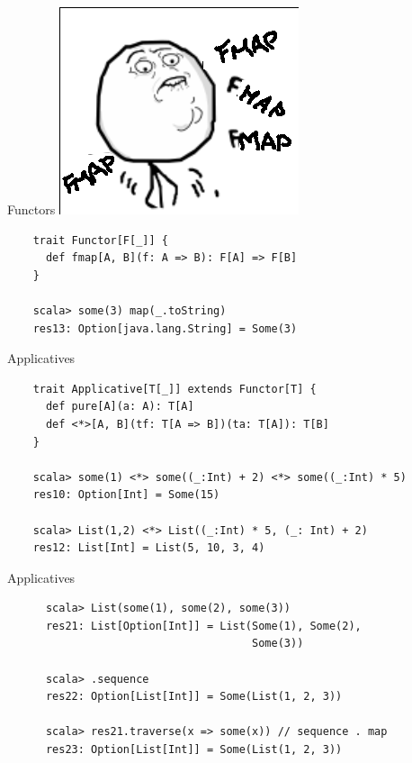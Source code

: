 \documentclass{beamer}
\begin{document}
\begin{frame}[fragile]{Functors}
  \includegraphics[scale=0.5]{img/fmapfmapfmap}
  \begin{verbatim}
    trait Functor[F[_]] {
      def fmap[A, B](f: A => B): F[A] => F[B]
    }

    scala> some(3) map(_.toString)
    res13: Option[java.lang.String] = Some(3)
  \end{verbatim}
\end{frame}

\begin{frame}[fragile]{Applicatives}
    \begin{verbatim}
    trait Applicative[T[_]] extends Functor[T] {
      def pure[A](a: A): T[A]
      def <*>[A, B](tf: T[A => B])(ta: T[A]): T[B]
    }

    scala> some(1) <*> some((_:Int) + 2) <*> some((_:Int) * 5)
    res10: Option[Int] = Some(15)

    scala> List(1,2) <*> List((_:Int) * 5, (_: Int) + 2)
    res12: List[Int] = List(5, 10, 3, 4)
  \end{verbatim}
\end{frame}

\begin{frame}[fragile]{Applicatives}
    \begin{verbatim}
      scala> List(some(1), some(2), some(3))
      res21: List[Option[Int]] = List(Some(1), Some(2),
                                      Some(3))

      scala> .sequence
      res22: Option[List[Int]] = Some(List(1, 2, 3))

      scala> res21.traverse(x => some(x)) // sequence . map
      res23: Option[List[Int]] = Some(List(1, 2, 3))
  \end{verbatim}
\end{frame}
\end{document}

